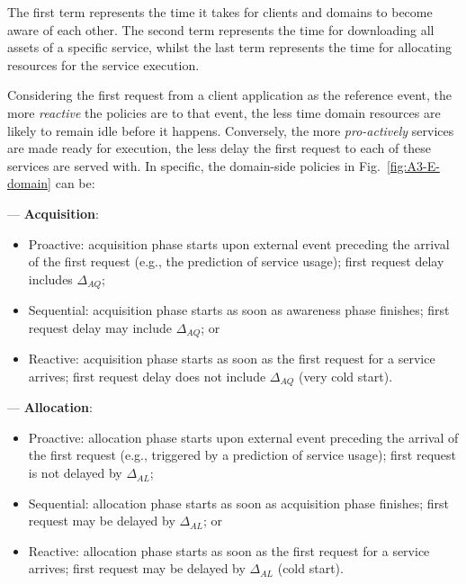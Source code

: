 The first term represents the time it takes for clients and domains to become aware of each other. The second term represents the time for downloading all assets of a specific service, whilst the last term represents the time for allocating resources for the service execution. 

Considering the first request from a client application as the reference event, the more \textit{reactive} the policies are to that event, the less time domain resources are likely to remain idle before it happens. Conversely, the more \textit{pro-actively} services are made ready for execution, the less delay the first request to each of these services are served with. In specific, the domain-side policies in Fig.~\ref{fig:A3-E-domain} can be:
\medskip
\medskip


--- \textbf{Acquisition}:

\begin{itemize}

\item Proactive: acquisition phase starts upon external event preceding the arrival of the first request (e.g., the prediction of service usage); first request delay includes $\Delta_{AQ}$;

\item Sequential: acquisition phase starts as soon as awareness phase finishes; first request delay may include $\Delta_{AQ}$; or

\item Reactive: acquisition phase starts as soon as the first request for a service arrives; first request delay does not include $\Delta_{AQ}$ (very cold start).

\end{itemize}


--- \textbf{Allocation}:


\begin{itemize}

\item Proactive: allocation phase starts upon external event preceding the arrival of the first request (e.g., triggered by a prediction of service usage); first request is not delayed by $\Delta_{AL}$;

\item Sequential: allocation phase starts as soon as acquisition phase finishes; first request may be delayed by $\Delta_{AL}$; or

\item Reactive: allocation phase starts as soon as the first request for a service arrives; first request may be delayed by $\Delta_{AL}$ (cold start).

\end{itemize}

